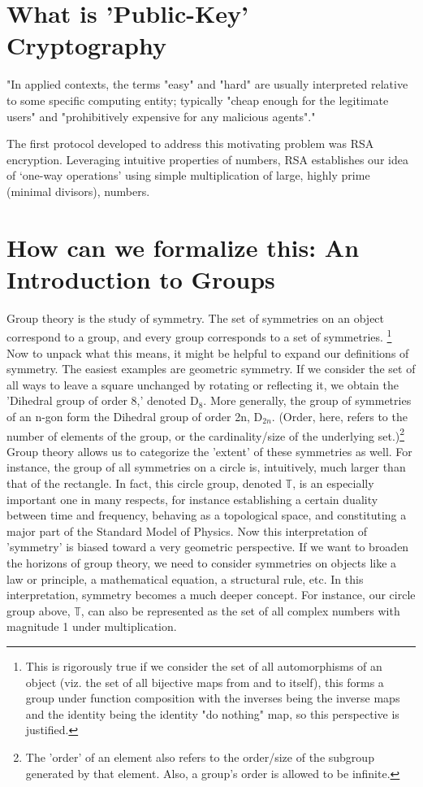 \documentclass[11pt,a4paper]{article}
\begin{document}
\section{What is 'Public-Key' Cryptography}
"In applied contexts, the terms "easy" and "hard" are usually interpreted relative to some specific computing entity; typically "cheap enough for the legitimate users" and "prohibitively expensive for any malicious agents"."

The first protocol developed to address this motivating problem was RSA encryption. Leveraging intuitive properties of numbers, RSA establishes our idea of ‘one-way operations’ using simple multiplication of large, highly prime (minimal divisors), numbers. 

\section{How can we formalize this: An Introduction to Groups}
Group theory is the study of symmetry. The set of symmetries on an object correspond to a group, and every group corresponds to a set of symmetries.
\footnote{This is rigorously true if we consider the set of all automorphisms of an object (viz. the set of all bijective maps from and to itself), this forms a group under function composition with the inverses being the inverse maps and the identity being the identity "do nothing" map, so this perspective is justified.} %
Now to unpack what this means, it might be helpful to expand our definitions of symmetry. The easiest examples are geometric symmetry. If we consider the set of all ways to leave a square unchanged by rotating or reflecting it, we obtain the 'Dihedral group of order 8,' denoted $\mathrm{D}_8$. More generally, the group of symmetries of an n-gon form the Dihedral group of order 2n, $\mathrm{D}_{2n}$. (Order, here, refers to the number of elements of the group, or the cardinality/size of the underlying set.)\footnote{The 'order' of an element also refers to the order/size of the subgroup generated by that element. Also, a group's order is allowed to be infinite.} Group theory allows us to categorize the 'extent' of these symmetries as well. For instance, the group of all symmetries on a circle is, intuitively, much larger than that of the rectangle. In fact, this circle group, denoted $\mathbb{T}$, is an especially important one in many respects, for instance establishing a certain duality between time and frequency, behaving as a topological space, and constituting a major part of the Standard Model of Physics.
  Now this interpretation of 'symmetry' is biased toward a very geometric perspective. If we want to broaden the horizons of group theory, we need to consider symmetries on objects like a law or principle, a mathematical equation, a structural rule, etc. In this interpretation, symmetry becomes a much deeper concept. For instance, our circle group above, $\mathbb{T}$, can also be represented as the set of all complex numbers with magnitude 1 under multiplication. 
\end{document}
